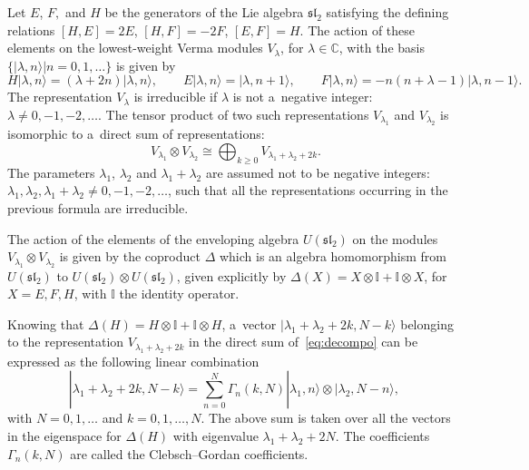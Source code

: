 \documentclass[pdftex]{sigma}
\numberwithin{equation}{section}
\theoremstyle{definition}
\begin{document}
Let $E$, $F,$ and $H$ be the generators of the Lie algebra $\mathfrak{sl}_2$ satisfying the defining relations
$
 [H,E]=2E$, $ [H,F]=-2F$, $ [E,F]=H$.
The action of these elements on the lowest-weight Verma modules $V_\lambda$, for $\lambda\in\mathbb{C}$, with the basis $\{|\lambda,n\rangle | n=0,1,\dots\}$ is given by
\[H|\lambda,n\rangle=(\lambda+2n)|\lambda,n\rangle, \qquad E|\lambda,n\rangle=|\lambda,n+1\rangle, \qquad F|\lambda,n\rangle=-n(n+\lambda-1)|\lambda,n-1\rangle.\]
The representation $V_\lambda$ is irreducible if $\lambda$ is not a~negative integer: $\lambda\neq 0,-1,-2,\dots$.
The tensor product of two such representations $V_{\lambda_1}$ and $V_{\lambda_2}$ is isomorphic to a~direct sum of representations:%
\begin{equation}
 \label{eq:decompo}
V_{\lambda_1}\otimes V_{\lambda_2} \cong \bigoplus_{k\geq 0} V_{\lambda_1+\lambda_2+2k}.
\end{equation}
The parameters $\lambda_1$, $\lambda_2$ and $\lambda_1+\lambda_2$ are assumed not to be negative integers: $\lambda_1, \lambda_2, \lambda_1+\lambda_2\neq 0,-1,-2,\dots$, such that all the representations occurring in the previous formula are irreducible.

The action of the elements of the enveloping algebra $U(\mathfrak{sl}_2)$ on the modules $V_{\lambda_1}\otimes V_{\lambda_2}$ is given by the coproduct $\Delta$ which is an algebra homomorphism from $U(\mathfrak{sl}_2)$ to $U(\mathfrak{sl}_2)\otimes U(\mathfrak{sl}_2)$, given explicitly by
$\Delta(X)=X\otimes \mathbb{I}+\mathbb{I}\otimes X$, for $ X=E,F,H$,
with $\mathbb{I}$ the identity operator.

Knowing that $\Delta(H)=H\otimes \mathbb{I}+\mathbb{I}\otimes H$, a~vector $|\lambda_1+\lambda_2+2k,N-k\rangle$ belonging to the representation $V_{\lambda_1+\lambda_2+2k}$ in the direct sum of~\eqref{eq:decompo} can be expressed as the following linear combination
\begin{equation}\label{eq:defCG}
|\lambda_1+\lambda_2+2k,N-k\rangle=\sum_{n=0}^N \Gamma_n(k,N) |\lambda_1,n\rangle\otimes |\lambda_2,N-n\rangle, \ \end{equation}
with $N=0,1,\dots$ and $k=0,1,\dots,N$.
The above sum is taken over all the vectors in the eigenspace for $\Delta(H)$ with eigenvalue $\lambda_1+\lambda_2+2N$.
The coefficients $\Gamma_n(k,N)$ are called the Clebsch--Gordan coefficients.
\end{document}
